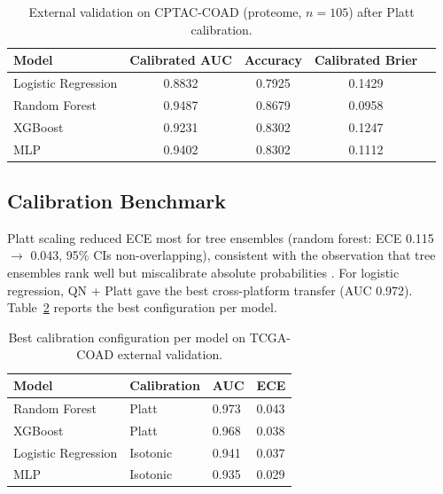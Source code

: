 \documentclass[11pt]{article}
\begin{document}
\begin{table}[htbp]
\centering
\caption{External validation on CPTAC-COAD (proteome, $n=105$) after Platt calibration.}
\label{tab:cpac}
\begin{tabular}{lcccc}
\toprule
\textbf{Model} & \textbf{Calibrated AUC} & \textbf{Accuracy} & \textbf{Calibrated Brier} \\
\midrule
Logistic Regression & 0.8832 & 0.7925 & 0.1429 \\
Random Forest & 0.9487 & 0.8679 & 0.0958 \\
XGBoost & 0.9231 & 0.8302 & 0.1247 \\
MLP & 0.9402 & 0.8302 & 0.1112 \\
\bottomrule
\end{tabular}
\end{table}

\subsection{Calibration Benchmark}
Platt scaling reduced ECE most for tree ensembles (random forest: ECE 0.115 $\rightarrow$ 0.043, 95\% CIs non-overlapping), consistent with the observation that tree ensembles rank well but miscalibrate absolute probabilities \cite{niculescu2005}. For logistic regression, QN + Platt gave the best cross-platform transfer (AUC 0.972). Table~\ref{tab:calib} reports the best configuration per model.

\begin{table}[htbp]
\centering
\caption{Best calibration configuration per model on TCGA-COAD external validation.}
\label{tab:calib}
\begin{tabular}{llll}
\toprule
\textbf{Model} & \textbf{Calibration} & \textbf{AUC} & \textbf{ECE} \\
\midrule
Random Forest & Platt & 0.973 & 0.043 \\
XGBoost & Platt & 0.968 & 0.038 \\
Logistic Regression & Isotonic & 0.941 & 0.037 \\
MLP & Isotonic & 0.935 & 0.029 \\
\bottomrule
\end{tabular}
\end{table}
\end{document}
